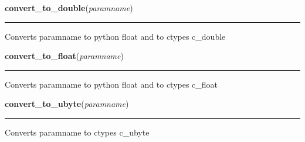     \label{xformslib:library:convert_to_double}

    \vspace{0.5ex}

\hspace{.8\funcindent}\begin{boxedminipage}{\funcwidth}

    \raggedright \textbf{convert\_to\_double}(\textit{paramname})

    \vspace{-1.5ex}

    \rule{\textwidth}{0.5\fboxrule}
\setlength{\parskip}{2ex}

Converts paramname to python float and to ctypes c\_double
\setlength{\parskip}{1ex}
    \end{boxedminipage}

    \label{xformslib:library:convert_to_float}

    \vspace{0.5ex}

\hspace{.8\funcindent}\begin{boxedminipage}{\funcwidth}

    \raggedright \textbf{convert\_to\_float}(\textit{paramname})

    \vspace{-1.5ex}

    \rule{\textwidth}{0.5\fboxrule}
\setlength{\parskip}{2ex}

Converts paramname to python float and to ctypes c\_float
\setlength{\parskip}{1ex}
    \end{boxedminipage}

    \label{xformslib:library:convert_to_ubyte}

    \vspace{0.5ex}

\hspace{.8\funcindent}\begin{boxedminipage}{\funcwidth}

    \raggedright \textbf{convert\_to\_ubyte}(\textit{paramname})

    \vspace{-1.5ex}

    \rule{\textwidth}{0.5\fboxrule}
\setlength{\parskip}{2ex}

Converts paramname to ctypes c\_ubyte
\setlength{\parskip}{1ex}
    \end{boxedminipage}

